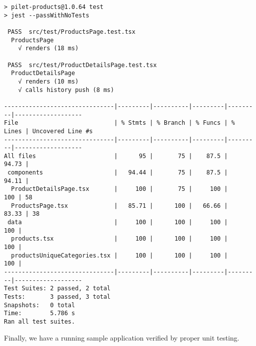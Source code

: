 \documentclass[a4paper]{book}
\begin{document}
\begin{lstlisting}[caption={pilet-products unit testing results}]
> pilet-products@1.0.64 test
> jest --passWithNoTests    

 PASS  src/test/ProductsPage.test.tsx
  ProductsPage
    √ renders (18 ms)

 PASS  src/test/ProductDetailsPage.test.tsx
  ProductDetailsPage
    √ renders (10 ms)
    √ calls history push (8 ms)

-------------------------------|---------|----------|---------|---------|-------------------
File                           | % Stmts | % Branch | % Funcs | % Lines | Uncovered Line #s
-------------------------------|---------|----------|---------|---------|-------------------
All files                      |      95 |       75 |    87.5 |   94.73 |
 components                    |   94.44 |       75 |    87.5 |   94.11 |
  ProductDetailsPage.tsx       |     100 |       75 |     100 |     100 | 58
  ProductsPage.tsx             |   85.71 |      100 |   66.66 |   83.33 | 38
 data                          |     100 |      100 |     100 |     100 |
  products.tsx                 |     100 |      100 |     100 |     100 |
  productsUniqueCategories.tsx |     100 |      100 |     100 |     100 |
-------------------------------|---------|----------|---------|---------|-------------------
Test Suites: 2 passed, 2 total
Tests:       3 passed, 3 total
Snapshots:   0 total
Time:        5.786 s
Ran all test suites.

\end{lstlisting}

Finally, we have a running sample application verified by proper unit testing.


\end{document}
